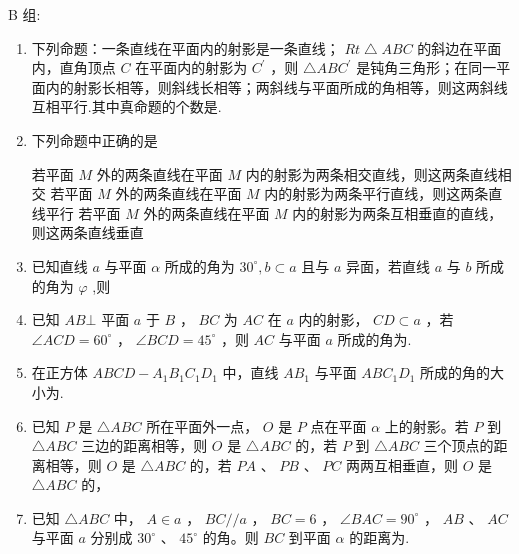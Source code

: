 B 组:
\begin{enumerate}


\item 下列命题：一条直线在平面内的射影是一条直线； ${Rt} \bigtriangleup  {ABC}$ 的斜边在平面内，直角顶点 $C$ 在平面内的射影为 ${C}^{\prime }$ ，则 $\bigtriangleup  {AB}{C}^{\prime }$ 是钝角三角形；在同一平面内的射影长相等，则斜线长相等；两斜线与平面所成的角相等，则这两斜线互相平行.其中真命题的个数是.

\item 下列命题中正确的是

{若平面 $M$ 外的两条直线在平面 $M$ 内的射影为两条相交直线，则这两条直线相交}
{若平面 $M$ 外的两条直线在平面 $M$ 内的射影为两条平行直线，则这两条直线平行}
{若平面 $M$ 外的两条直线在平面 $M$ 内的射影为两条互相垂直的直线，则这两条直线垂直}

\item 已知直线 $a$ 与平面 $\alpha$ 所成的角为 ${30}^{ \circ  },b \subset  a$ 且与 $a$ 异面，若直线 $a$ 与 $b$ 所成的角为 $\varphi$ ,则



\item 已知 ${AB}\bot$ 平面 $a$ 于 $B$ ， ${BC}$ 为 ${AC}$ 在 $a$ 内的射影， ${CD} \subset  a$ ，若 $\angle {ACD} = {60}^{ \circ  }$ ， $\angle {BCD} = {45}^{ \circ  }$ ，则 ${AC}$ 与平面 $a$ 所成的角为.

\item 在正方体 ${ABCD} - {A}_{1}{B}_{1}{C}_{1}{D}_{1}$ 中，直线 $A{B}_{1}$ 与平面 ${AB}{C}_{1}{D}_{1}$ 所成的角的大小为.

\item 已知 $P$ 是 $\bigtriangleup  {ABC}$ 所在平面外一点， $O$ 是 $P$ 点在平面 $\alpha$ 上的射影。若 $P$ 到 $\bigtriangleup  {ABC}$ 三边的距离相等，则 $O$ 是 $\bigtriangleup  {ABC}$ 的，若 $P$ 到 $\bigtriangleup  {ABC}$ 三个顶点的距离相等，则 $O$ 是 $\bigtriangleup  {ABC}$ 的，若 ${PA}\text{ 、 }{PB}\text{ 、 }{PC}$ 两两互相垂直，则 $O$ 是 $\bigtriangleup  {ABC}$ 的，

\item 已知 $\bigtriangleup  {ABC}$ 中， $A \in  a$ ， ${BC}//a$ ， ${BC} = 6$ ， $\angle {BAC} = {90}^{ \circ  }$ ， ${AB}$ 、 ${AC}$ 与平面 $a$ 分别成 ${30}^{ \circ  }$ 、 ${45}^{ \circ  }$ 的角。则 ${BC}$ 到平面 $\alpha$ 的距离为.


\end{enumerate}
